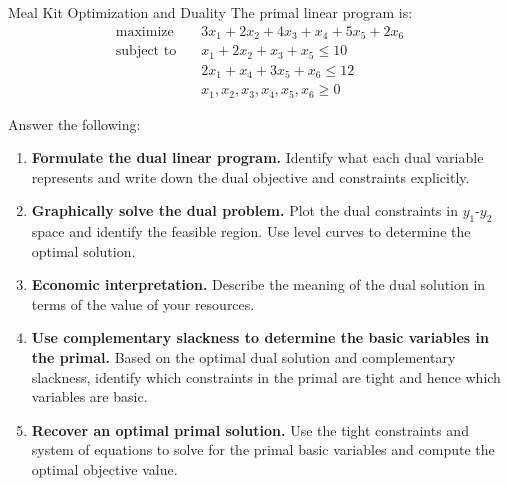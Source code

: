 \begin{ex}{Meal Kit Optimization and Duality}{}
The primal linear program is:
\begin{align*}
\text{maximize} \quad & 3x_1 + 2x_2 + 4x_3 + x_4 + 5x_5 + 2x_6 \\
\text{subject to} \quad & x_1 + 2x_2 + x_3 + x_5 \leq 10 \\[-0.5em]
& 2x_1 + x_4 + 3x_5 + x_6 \leq 12 \\
& x_1, x_2, x_3, x_4, x_5, x_6 \geq 0
\end{align*}

Answer the following:
\begin{enumerate}
  \item \textbf{Formulate the dual linear program.}  
  Identify what each dual variable represents and write down the dual objective and constraints explicitly.

  \item \textbf{Graphically solve the dual problem.}  
  Plot the dual constraints in $y_1$-$y_2$ space and identify the feasible region. Use level curves to determine the optimal solution.

  \item \textbf{Economic interpretation.}  
  Describe the meaning of the dual solution in terms of the value of your resources.

  \item \textbf{Use complementary slackness to determine the basic variables in the primal.}  
  Based on the optimal dual solution and complementary slackness, identify which constraints in the primal are tight and hence which variables are basic.

  \item \textbf{Recover an optimal primal solution.}  
  Use the tight constraints and system of equations to solve for the primal basic variables and compute the optimal objective value.
\end{enumerate}
\end{ex}


